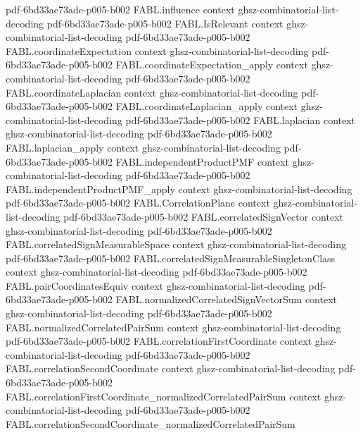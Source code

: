 \begin{theorem}
  {pdf-6bd33ae73ade-p005-b002}
\proofstep
  {FABL.influence}
  {context}
  {ghsz-combinatorial-list-decoding}
  {pdf-6bd33ae73ade-p005-b002}
\proofstep
  {FABL.IsRelevant}
  {context}
  {ghsz-combinatorial-list-decoding}
  {pdf-6bd33ae73ade-p005-b002}
\proofstep
  {FABL.coordinateExpectation}
  {context}
  {ghsz-combinatorial-list-decoding}
  {pdf-6bd33ae73ade-p005-b002}
\proofstep
  {FABL.coordinateExpectation_apply}
  {context}
  {ghsz-combinatorial-list-decoding}
  {pdf-6bd33ae73ade-p005-b002}
\proofstep
  {FABL.coordinateLaplacian}
  {context}
  {ghsz-combinatorial-list-decoding}
  {pdf-6bd33ae73ade-p005-b002}
\proofstep
  {FABL.coordinateLaplacian_apply}
  {context}
  {ghsz-combinatorial-list-decoding}
  {pdf-6bd33ae73ade-p005-b002}
\proofstep
  {FABL.laplacian}
  {context}
  {ghsz-combinatorial-list-decoding}
  {pdf-6bd33ae73ade-p005-b002}
\proofstep
  {FABL.laplacian_apply}
  {context}
  {ghsz-combinatorial-list-decoding}
  {pdf-6bd33ae73ade-p005-b002}
\proofstep
  {FABL.independentProductPMF}
  {context}
  {ghsz-combinatorial-list-decoding}
  {pdf-6bd33ae73ade-p005-b002}
\proofstep
  {FABL.independentProductPMF_apply}
  {context}
  {ghsz-combinatorial-list-decoding}
  {pdf-6bd33ae73ade-p005-b002}
\proofstep
  {FABL.CorrelationPlane}
  {context}
  {ghsz-combinatorial-list-decoding}
  {pdf-6bd33ae73ade-p005-b002}
\proofstep
  {FABL.correlatedSignVector}
  {context}
  {ghsz-combinatorial-list-decoding}
  {pdf-6bd33ae73ade-p005-b002}
\proofstep
  {FABL.correlatedSignMeasurableSpace}
  {context}
  {ghsz-combinatorial-list-decoding}
  {pdf-6bd33ae73ade-p005-b002}
\proofstep
  {FABL.correlatedSignMeasurableSingletonClass}
  {context}
  {ghsz-combinatorial-list-decoding}
  {pdf-6bd33ae73ade-p005-b002}
\proofstep
  {FABL.pairCoordinatesEquiv}
  {context}
  {ghsz-combinatorial-list-decoding}
  {pdf-6bd33ae73ade-p005-b002}
\proofstep
  {FABL.normalizedCorrelatedSignVectorSum}
  {context}
  {ghsz-combinatorial-list-decoding}
  {pdf-6bd33ae73ade-p005-b002}
\proofstep
  {FABL.normalizedCorrelatedPairSum}
  {context}
  {ghsz-combinatorial-list-decoding}
  {pdf-6bd33ae73ade-p005-b002}
\proofstep
  {FABL.correlationFirstCoordinate}
  {context}
  {ghsz-combinatorial-list-decoding}
  {pdf-6bd33ae73ade-p005-b002}
\proofstep
  {FABL.correlationSecondCoordinate}
  {context}
  {ghsz-combinatorial-list-decoding}
  {pdf-6bd33ae73ade-p005-b002}
\proofstep
  {FABL.correlationFirstCoordinate_normalizedCorrelatedPairSum}
  {context}
  {ghsz-combinatorial-list-decoding}
  {pdf-6bd33ae73ade-p005-b002}
\proofstep
  {FABL.correlationSecondCoordinate_normalizedCorrelatedPairSum}

\end{theorem}
